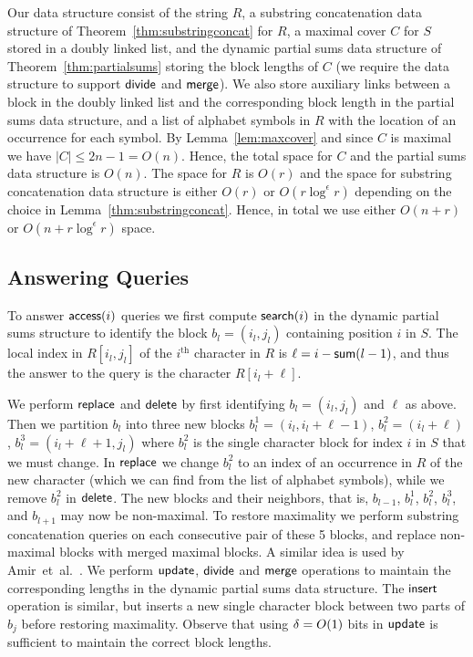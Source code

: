 Our data structure consist of the string $R$, a substring concatenation data structure of Theorem~\ref{thm:substringconcat} for $R$, a maximal cover $C$ for $S$ stored in a doubly linked list, and the dynamic partial sums data structure of Theorem~\ref{thm:partialsums} storing the block lengths of $C$ (we require the data structure to support $\mathsf{divide}$ and $\mathsf{merge}$). 
We also store auxiliary links between a block in the doubly linked list and the corresponding block length in the partial sums data structure, and a list of alphabet symbols in $R$ with the location of an occurrence for each symbol.
By Lemma~\ref{lem:maxcover} and since $C$ is maximal we have $|C| \leq 2n-1 = O(n)$. Hence, the total space for $C$ and the partial sums data structure is $O(n)$. The space for $R$ is $O(r)$ and the space for substring concatenation data structure is either $O(r)$ or $O(r \log^\epsilon r)$ depending on the choice in Lemma~\ref{thm:substringconcat}. Hence, in total we use either $O(n + r)$ or $O(n +r \log^\epsilon r)$ space.

\subsection{Answering Queries}
To answer $\mathsf{access}(i)$ queries we first compute $\mathsf{search}(i)$ in the dynamic partial sums structure to identify the block $b_l = (i_l,j_l)$ containing position $i$ in $S$. The local index in $R[i_l,j_l]$ of the $i^\text{th}$ character in $R$ is $\ell = i - \mathsf{sum}(l-1)$, and thus the answer to the query is the character $R[i_l + \ell]$.

We perform $\mathsf{replace}$ and $\mathsf{delete}$ by first identifying $b_l = (i_l,j_l)$ and $\ell$ as above. Then we partition $b_l$ into three new blocks 
${b^1_l}=(i_l, i_l+\ell-1)$, ${b^2_l} = (i_l+\ell)$, ${b^3_l}=(i_l+\ell+1, j_l)$ where $b^2_l$ is the single character block for index $i$ in $S$ that we must change. 
In $\mathsf{replace}$ we change ${b^2_l}$ to an index of an occurrence in $R$ of the new character (which we can find from the list of alphabet symbols), while we remove ${b^2_l}$ in $\mathsf{delete}$. The new blocks and their neighbors, that is, $b_{l-1}$, ${b^1_l}$, ${b^2_l}$, ${b^3_l}$, and $b_{l+1}$ may now be non-maximal. To restore maximality we perform substring concatenation queries on each consecutive pair of these 5 blocks, and replace non-maximal blocks with merged maximal blocks. A similar idea is used by Amir~et~al.~\cite{amir2007dynamic}. We perform $\mathsf{update}$, $\mathsf{divide}$ and $\mathsf{merge}$ operations to maintain the corresponding lengths in the dynamic partial sums data structure. The $\mathsf{insert}$ operation is similar, but inserts a new single character block between two parts of $b_j$ before restoring maximality. Observe that using $\delta = O(1)$ bits in $\mathsf{update}$ is sufficient to maintain the correct block lengths.

